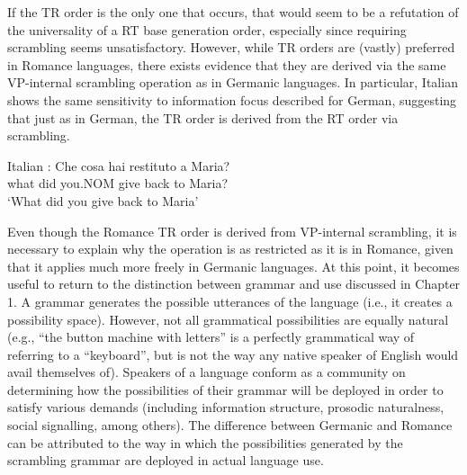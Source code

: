 If the TR order is the only one that occurs, that would seem to be a refutation of the universality of a RT base generation order, especially since requiring scrambling seems unsatisfactory. However, while TR orders are (vastly) preferred in Romance languages, there exists evidence that they are derived via the same VP-internal scrambling operation as in Germanic languages. In particular, Italian shows the same sensitivity to information focus described for German, suggesting that just as in German, the TR order is derived from the RT order via scrambling.

\begin{exe}
\ex Italian \citep[ex 26]{Belletti.1995}:
\gll Che cosa hai restituto a Maria?\\
what did you.NOM {give back} to Maria?\\
\trans `What did you give back to Maria'
\begin{xlist}
\end{xlist} 
\end{exe}%

Even though the Romance TR order is derived from VP-internal scrambling, it is necessary to explain why the operation is as restricted as it is in Romance, given that it applies much more freely in Germanic languages. At this point, it becomes useful to return to the distinction between grammar and use discussed in Chapter 1. A grammar generates the possible utterances of the language (i.e., it creates a possibility space). However, not all grammatical possibilities are equally natural (e.g., ``the button machine with letters'' is a perfectly grammatical way of referring to a ``keyboard'', but is not the way any native speaker of English would avail themselves of). Speakers of a language conform as a community on determining how the possibilities of their grammar will be deployed in order to satisfy various demands (including information structure, prosodic naturalness, social signalling, among others). The difference between Germanic and Romance can be attributed to the way in which the possibilities generated by the scrambling grammar are deployed in actual language use.

